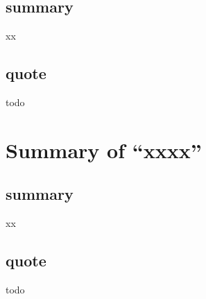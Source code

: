 \documentclass{llncs}
\begin{document}
\subsection{summary}
xx

\subsection{quote}
todo


\newpage
\section{Summary of ``xxxx''\cite{xxxxxxx}} 
  \label{section:xxxxxx}
\subsection{summary}
xx

\subsection{quote}
todo

\newpage


% 


 
 
\end{document}

